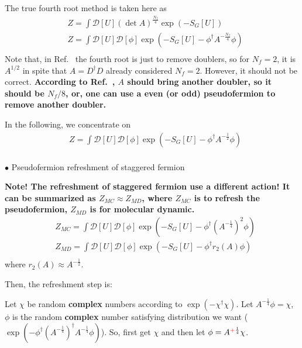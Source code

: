 The true fourth root method is taken here as
\begin{equation}
\begin{split}
&Z=\int \mathcal{D}[U] \left(\det A \right)^{\frac{N_f}{4}}\exp \left(-S_G[U]\right)\\
&Z=\int \mathcal{D}[U]  \mathcal {D}[\phi]\exp \left(-S_G[U]-\phi ^{\dagger} A^{-\frac{N_f}{4}} \phi \right)\\
\end{split}
\end{equation}
Note that, in Ref.~\cite{staggeredRHMC} the fourth root is just to remove doublers, so for $N_f=2$, it is $A^{1/2}$ in spite that $A=D^{\dagger}D$ already considered $N_f=2$.
However, it should not be correct.
\textcolor[rgb]{1,0,0}{\textbf{According to Ref.~\cite{Wong:2007uz}, $A$ should bring another doubler, so it should be $N_f/8$, or, one can use a even (or odd) pseudofermion to remove another doubler.}}

In the following, we concentrate on
\begin{equation}
\begin{split}
&Z=\int \mathcal{D}[U]  \mathcal {D}[\phi]\exp \left(-S_G[U]-\phi ^{\dagger} A^{-\frac{1}{2}} \phi \right)\\
\end{split}
\end{equation}

$\bullet$ Pseudofermion refreshment of staggered fermion

\textbf{\textcolor[rgb]{1,0,0}{Note! The refreshment of staggered fermion use a different action!} It can be summarized as $Z_{MC}\approx Z_{MD}$, where $Z_{MC}$ is to refresh the pseudofermion, $Z_{MD}$ is for molecular dynamic.}
\begin{equation}
\begin{split}
&Z_{MC}=\int \mathcal{D}[U]  \mathcal {D}[\phi]\exp \left(-S_G[U]-\phi ^{\dagger} \left(A^{-\frac{1}{4}}\right)^2 \phi \right)\\
&Z_{MD}=\int \mathcal{D}[U]  \mathcal {D}[\phi]\exp \left(-S_G[U]-\phi ^{\dagger} r_2(A) \phi \right)\\
\end{split}
\end{equation}
where $r_2(A)\approx A^{-\frac{1}{2}}$.

Then, the refreshment step is:

Let $\chi$ be random \textbf{complex} numbers according to $\exp (-\chi ^{\dagger}\chi)$. Let $A^{-\frac{1}{4}}\phi=\chi$, $\phi$ is the random \textbf{complex} number satisfying distribution we want ($\exp (-\phi^{\dagger} \left(A^{-\frac{1}{4}}\right)^{\dagger} A^{-\frac{1}{4}} \phi)$). So, first get $\chi$ and then let $\phi = A^{\textcolor[rgb]{1,0,0}{+}\frac{1}{4}}\chi$.

